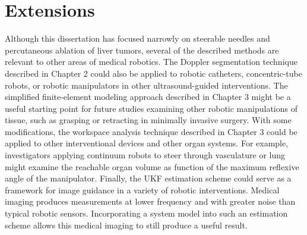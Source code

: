 \section{Extensions}
Although this dissertation has focused narrowly on steerable needles and percutaneous ablation of liver tumors, several of the described methods are relevant to other areas of medical robotics. The Doppler segmentation technique described in Chapter 2 could also be applied to robotic catheters, concentric-tube robots, or robotic manipulators in other ultrasound-guided interventions. The simplified finite-element modeling approach described in Chapter 3 might be a useful starting point for future studies examining other robotic manipulations of tissue, such as grasping or retracting in minimally invasive surgery. With some modifications, the workspace analysis technique described in Chapter 3 could be applied to other interventional devices and other organ systems. For example, investigators applying continuum robots to steer through vasculature or lung might examine the reachable organ volume as function of the maximum reflexive angle of the manipulator. Finally, the UKF estimation scheme could serve as a framework for image guidance in a variety of robotic interventions. Medical imaging produces measurements at lower frequency and with greater noise than typical robotic sensors. Incorporating a system model into such an estimation scheme allows this medical imaging to still produce a useful result.




